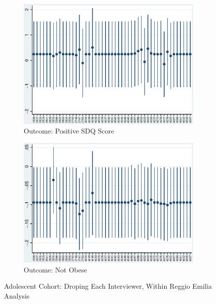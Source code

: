     \begin{figure}[H]
      \centering
        \begin{subfigure}[t]{0.75\textwidth}
          \includegraphics[width=\textwidth]{../../../output/image/coef-interviewer-adol-pos_childSDQ_score.eps}       
\caption{Outcome: Positive SDQ Score}        
        \end{subfigure}
        \begin{subfigure}[t]{0.75\textwidth}
          \includegraphics[width=\textwidth]{../../../output/image/coef-interviewer-adol-BMI_obese.eps}       
 \caption{Outcome: Not Obese}        
        \end{subfigure}
      \caption{Adolescent Cohort: Droping Each Interviewer, Within Reggio Emilia Analysis}  \label{fig:adol-sensitivity-interviewer}
    \end{figure}


